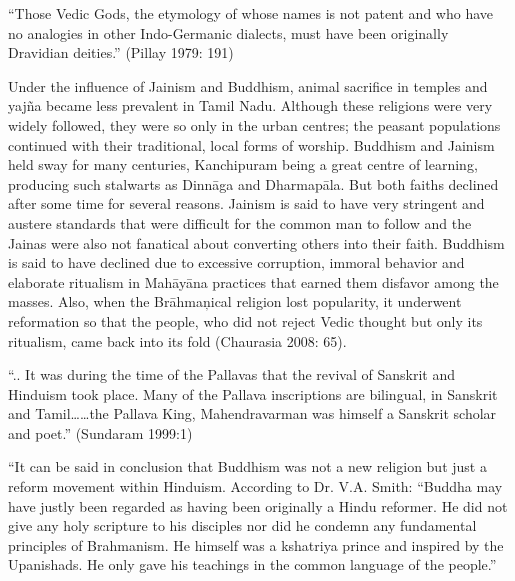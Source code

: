 \begin{myquote}
“Those Vedic Gods, the etymology of whose names is not patent and who have no analogies in other Indo-Germanic dialects, must have been originally Dravidian deities.” (Pillay 1979: 191)
\end{myquote}

Under the influence of Jainism and Buddhism, animal sacrifice in temples and yajña became less prevalent in Tamil Nadu. Although these religions were very widely followed, they were so only in the urban centres; the peasant populations continued with their traditional, local forms of worship. Buddhism and Jainism held sway for many centuries, Kanchipuram being a great centre of learning, producing such stalwarts as Dinnāga and Dharmapāla. But both faiths declined after some time for several reasons. Jainism is said to have very stringent and austere standards that were difficult for the common man to follow and the Jainas were also not fanatical about converting others into their faith. Buddhism is said to have declined due to excessive corruption, immoral behavior and elaborate ritualism in Mahāyāna practices that earned them disfavor among the masses. Also, when the Brāhmaņical religion lost popularity, it underwent reformation so that the people, who did not reject Vedic thought but only its ritualism, came back into its fold (Chaurasia 2008: 65).

\vskip 2pt

\begin{myquote}
“.. It was during the time of the Pallavas that the revival of Sanskrit and Hinduism took place. Many of the Pallava inscriptions are bilingual, in Sanskrit and Tamil……the Pallava King, Mahendravarman was himself a Sanskrit scholar and poet.” (Sundaram 1999:1)
\end{myquote}

\vskip 2pt

\begin{myquote}
“It can be said in conclusion that Buddhism was not a new religion but just a reform movement within Hinduism. According to Dr. V.A. Smith: “Buddha may have justly been regarded as having been originally a Hindu reformer. He did not give any holy scripture to his disciples nor did he condemn any fundamental principles of Brahmanism. He himself was a kshatriya prince and inspired by the Upanishads. He only gave his teachings in the common language of the people.”
\end{myquote}

